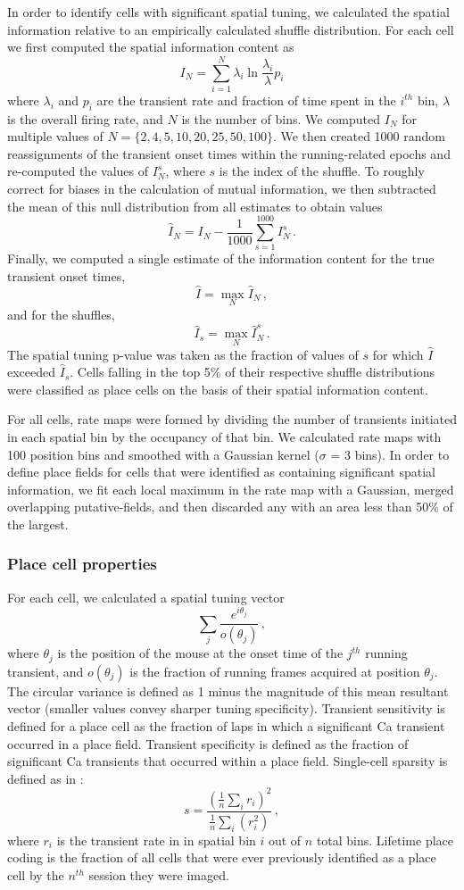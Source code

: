 In order to identify cells with significant spatial tuning, we calculated the spatial information relative to an empirically calculated shuffle distribution. For each cell we first computed the spatial information content \citep{Skaggs1993} as
$$I_N = \sum^N_{i=1}\lambda_i \ln\frac{\lambda_i}{\lambda}p_i$$
where $\lambda_i$ and $p_i$ are the transient rate and fraction of time spent in the $i^{th}$ bin, $\lambda$ is the overall firing rate, and $N$ is the number of bins. We computed $I_N$ for multiple values of $N = \{2, 4, 5, 10, 20, 25, 50, 100\}$. We then created 1000 random reassignments of the transient onset times within the running-related epochs and re-computed the values of $I^s_N$, where $s$ is the index of the shuffle. To roughly correct for biases in the calculation of mutual information, we then subtracted the mean of this null distribution from all estimates to obtain values $$\hat{I}_N = I_N - \frac{1}{1000}\sum^{1000}_{s=1}I^s_N\,.$$ Finally, we computed a single estimate of the information content for the true transient onset times,
$$\hat{I} = \max\limits_N{\hat{I}_N}\,,$$
and for the shuffles,
$$\hat{I}_s = \max\limits_N{\hat{I}_N^s}\,.$$
The spatial tuning p-value was taken as the fraction of values of $s$ for which $\hat{I}$ exceeded $\hat{I}_s$. Cells falling in the top 5\% of their respective shuffle distributions were classified as place cells on the basis of their spatial information content.

For all cells, rate maps were formed by dividing the number of transients initiated in each spatial bin by the occupancy of that bin.  We calculated rate maps with 100 position bins and smoothed with a Gaussian kernel ($\sigma$ = 3 bins). In order to define place fields for cells that were identified as containing significant spatial information, we fit each local maximum in the rate map with a Gaussian, merged overlapping putative-fields, and then discarded any with an area less than 50\% of the largest.

\subsubsection{Place cell properties}
\label{sec:df:methods:pc_properties}
For each cell, we calculated a spatial tuning vector
$$\sum_j\frac{e^{i\theta_j}}{o(\theta_j)}\,,$$
where $\theta_j$ is the position of the mouse at the onset time of the $j^{th}$ running transient, and $o(\theta_j)$ is the fraction of running frames acquired at position $\theta_j$. The circular variance is defined as 1 minus the magnitude of this mean resultant vector (smaller values convey sharper tuning specificity). Transient sensitivity is defined for a place cell as the fraction of laps in which a significant Ca transient occurred in a place field. Transient specificity is defined as the fraction of significant Ca transients that occurred within a place field. Single-cell sparsity is defined as in \citealt{Ahmed2009}:
$$s=\frac{(\frac{1}{n}\sum_ir_i)^2}{\frac{1}{n}\sum_i(r_i^2)}\,,$$
where $r_i$ is the transient rate in in spatial bin $i$ out of $n$ total bins. Lifetime place coding is the fraction of all cells that were ever previously identified as a place cell by the $n^{th}$ session they were imaged.

